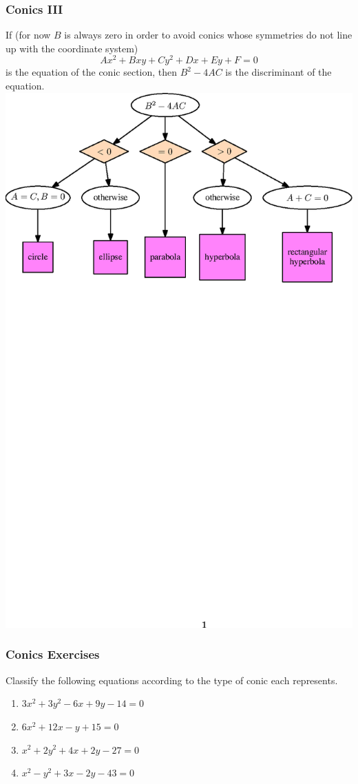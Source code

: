 \documentclass[xcolor=dvipsnames]{beamer}
\begin{document}
\begin{frame}
  \frametitle{Conics III}
  If (for now $B$ is always zero in order to avoid conics whose
  symmetries do not line up with the coordinate system)
\begin{equation}
  \label{eq:adailaek}
Ax^{2}+Bxy+Cy^{2}+Dx+Ey+F=0
\end{equation}
is the equation of the conic section, then $B^{2}-4AC$ is the
\alert{discriminant} of the equation. 
\includegraphics[scale=.65]{conicdiscriminant.eps}
\end{frame}

\begin{frame}
  \frametitle{Conics Exercises}
Classify the following equations according to the type of conic each represents.
\begin{enumerate}
\item<1-> $3x^{2}+3y^{2}-6x+9y-14=0$
\item<2-> $6x^{2}+12x-y+15=0$
\item<3-> $x^{2}+2y^{2}+4x+2y-27=0$
\item<4-> $x^{2}-y^{2}+3x-2y-43=0$
\end{enumerate}
\end{frame}
\end{document}
